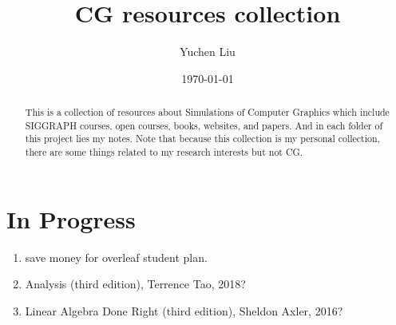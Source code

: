 \documentclass{article}
\title{CG resources collection}
\author{Yuchen Liu}
\date{\today}
\begin{document}
\setcounter{section}{-1}
\maketitle
\tableofcontents

\begin{abstract}
    This is a collection of resources about Simulations of Computer Graphics which include SIGGRAPH courses, open courses, books, websites, and papers. And in each folder of this project lies my notes. Note that because this collection is my personal collection, there are some things related to my research interests but not CG.
\end{abstract}

\section{In Progress}
\begin{enumerate}
    \item save money for overleaf student plan.
    \item Analysis (third edition), Terrence Tao, 2018?
    \item Linear Algebra Done Right (third edition), Sheldon Axler, 2016?
\end{enumerate}

\newpage
\end{document}
